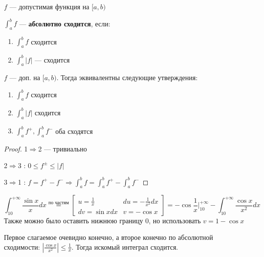 

\cfoot{}



\begin{definition}
    $f$ --- допустимая функция на $[a, b)$

    $\int_a^b f$ --- \textbf{абсолютно сходится}, если:
    \begin{enumerate}
        \item $\int_a^b f$ сходится
        \item $\int_a^b |f|$ --- сходится
    \end{enumerate}
\end{definition}

\begin{theorem}
    $f$ --- доп. на $[a, b)$. Тогда эквивалентны следующие утверждения:
    \begin{enumerate}
        \item $\int_a^b f$ сходится
        \item $\int_a^b |f|$ сходится
        \item $\int_a^b f^+, \int_a^b f^-$ оба сходятся
    \end{enumerate}
\end{theorem}
\begin{proof}
    1$\Rightarrow$2 --- тривиально

    2$\Rightarrow$3 : $0\leq f^{\pm}\leq |f|$

    3$\Rightarrow$1 : $f=f^+ - f^- \Rightarrow \int_a^b f = \int_a^b f^+ - \int_a^b f^-$
\end{proof}

\begin{example}
    $$\int_{10}^{+\infty} \frac{\sin x}{x}dx \stackrel{\text{по частям}}{=} \left[\begin{array}{lr}
        u = \frac{1}{x} & du = -\frac{1}{x^2} dx \\
        dv = \sin x dx & v = -\cos x
    \end{array}\right]=-\cos \frac{1}{x} \bigg|_{10}^{+\infty} - \int_{10}^{+\infty} \frac{\cos x}{x^2} dx$$
    Также можно было оставить нижнюю границу $0$, но использовать $v=1-\cos x$

    Первое слагаемое очевидно конечно, а второе конечно по абсолютной сходимости: $\left|\frac{\cos x}{x^2}\right|\leq \frac{1}{x}$. Тогда искомый интеграл сходится.
\end{example}

